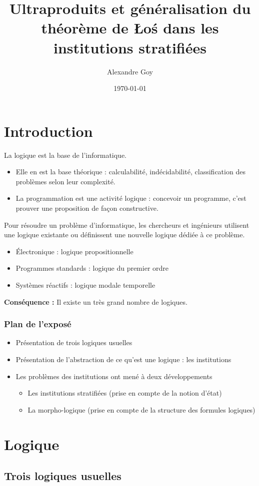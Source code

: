 \documentclass{beamer}
\title[Morpho-logique]{Ultraproduits et généralisation du théorème de \L o\'s dans les institutions stratifiées}
\author{Alexandre Goy}
\institute[Parcours MP]
{
CentraleSupélec, Parcours Maths-Physique
}
\date{\today}
\newcommand{\itemz}{\item[$\triangleright$]}
\begin{document}
\begin{frame}
\titlepage
\end{frame}

\section*{Introduction}

\begin{frame}
La logique est la base de l'informatique.
\begin{itemize}
\itemz Elle en est la base théorique : calculabilité, indécidabilité, classification des problèmes selon leur complexité.
\itemz La programmation est une activité logique : concevoir un programme, c'est prouver une proposition de façon constructive.
\end{itemize}
\pause
Pour résoudre un problème d'informatique, les chercheurs et ingénieurs utilisent une logique existante ou définissent une nouvelle logique dédiée à ce problème. \pause 
\begin{itemize}
\itemz \'Electronique : logique propositionnelle
\itemz Programmes standards : logique du premier ordre
\itemz Systèmes réactifs : logique modale temporelle
\end{itemize} \pause 
\textbf{Conséquence :} Il existe un très grand nombre de logiques.

\end{frame}

\begin{frame}
\frametitle{Plan de l'exposé}
\begin{itemize}
\itemz Présentation de trois logiques usuelles
\itemz Présentation de l'abstraction de ce qu'est une logique : les institutions
\itemz Les problèmes des institutions ont mené à deux développements
\begin{itemize}
\itemz Les institutions stratifiées (prise en compte de la notion d'état)
\itemz La morpho-logique (prise en compte de la structure des formules logiques)
\end{itemize}
\end{itemize}
\end{frame}

\section{Logique}

\subsection{Trois logiques usuelles}
\end{document}
